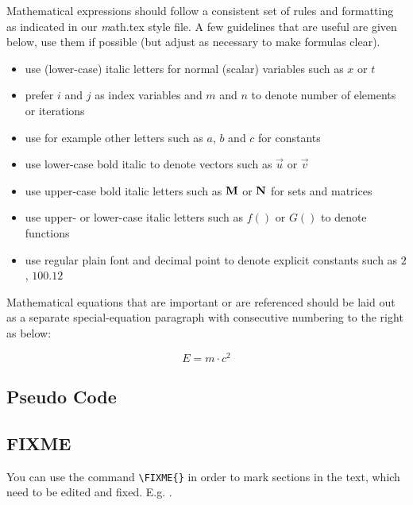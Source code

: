 \documentclass[11pt, a4paper,oneside,chapterprefix=false]{scrbook}
\newcommand{\FIXME}[1]{{\color{RED}{\textbf{FIX}: #1}}}
\begin{document}
Mathematical expressions should follow a consistent set of rules and formatting as indicated in our {\textit math.tex} style file. A few guidelines that are useful are given below, use them if possible (but adjust as necessary to make formulas clear).

\begin{itemize}
\item use (lower-case) italic letters for normal (scalar) variables such as $x$ or $t$
\item prefer $i$ and $j$ as index variables and $m$ and $n$ to denote number of elements or iterations
\item use for example other letters such as $a$, $b$ and $c$ for constants
\item use lower-case bold italic to denote vectors such as $\vec{u}$ or $\vec{v}$
\item use upper-case bold italic letters such as $\mathbf{M}$ or $\mathbf{N}$ for sets and matrices
\item use upper- or lower-case italic letters such as $f()$ or $G()$ to denote functions
\item use regular plain font and decimal point to denote explicit constants such as $2$, $100.12$
\end{itemize}

Mathematical equations that are important or are referenced should be laid out as a separate special-equation paragraph with consecutive numbering to the right as below:

\begin{equation}
E = m \cdot c^2
\label{eq:einstein}
\end{equation}

\subsection{Pseudo Code}


\vspace{10mm}

\subsection{FIXME}
You can use the command \verb!\FIXME{}! in order to mark sections in the text, which need to be edited and fixed. E.g. \FIXME{check reference XY}.
\end{document}
